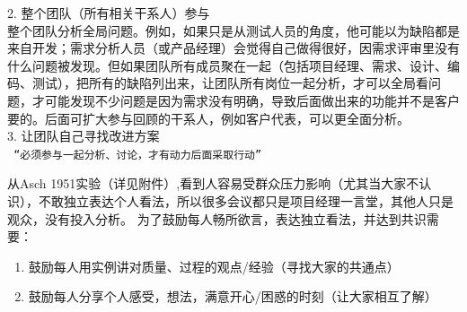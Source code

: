 2. 整个团队（所有相关干系人）参与\\
整个团队分析全局问题。例如，如果只是从测试人员的角度，他可能以为缺陷都是来自开发；需求分析人员（或产品经理）会觉得自己做得很好，因需求评审里没有什么问题被发现。但如果团队所有成员聚在一起（包括项目经理、需求、设计、编码、测试），把所有的缺陷列出来，让团队所有岗位一起分析，才可以全局看问题，才可能发现不少问题是因为需求没有明确，导致后面做出来的功能并不是客户要的。后面可扩大参与回顾的干系人，例如客户代表，可以更全面分析。\\
3. 让团队自己寻找改进方案 \\

\texttt{~“必须参与一起分析、讨论，才有动力后面采取行动”}


从Asch
1951实验（详见附件）,看到人容易受群众压力影响（尤其当大家不认识），不敢独立表达个人看法，所以很多会议都只是项目经理一言堂，其他人只是观众，没有投入分析。
为了鼓励每人畅所欲言，表达独立看法，并达到共识需要：

\begin{enumerate}
\tightlist
\item
  鼓励每人用实例讲对质量、过程的观点/经验（寻找大家的共通点）
\item
  鼓励每人分享个人感受，想法，满意开心/困惑的时刻（让大家相互了解）
\end{enumerate}

